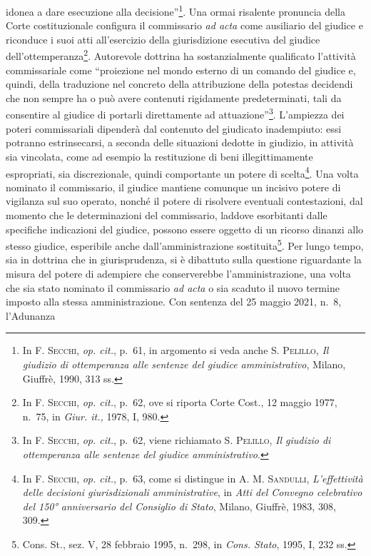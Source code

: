 \documentclass[12pt,it,a4paper,]{report}
\begin{document}
idonea a dare esecuzione alla decisione''\footnote{In
  \textsc{F. Secchi}, \emph{op. cit.}, p.~61, in argomento si veda anche
  S. \textsc{Pelillo}, \emph{Il giudizio di ottemperanza alle sentenze
  del giudice amministrativo}, Milano, Giuffrè, 1990, 313 ss.}. Una
ormai risalente pronuncia della Corte costituzionale configura il
commissario \emph{ad acta} come ausiliario del giudice e riconduce i
suoi atti all'esercizio della giurisdizione esecutiva del giudice
dell'ottemperanza\footnote{In \textsc{F. Secchi}, \emph{op. cit.},
  p.~62, ove si riporta Corte Cost., 12 maggio 1977, n.~75, in
  \emph{Giur. it.,} 1978, I, 980.}. Autorevole dottrina ha
sostanzialmente qualificato l'attività commissariale come ``proiezione
nel mondo esterno di un comando del giudice e, quindi, della traduzione
nel concreto della attribuzione della potestas decidendi che non sempre
ha o può avere contenuti rigidamente predeterminati, tali da consentire
al giudice di portarli direttamente ad attuazione''\footnote{In
  \textsc{F. Secchi}, \emph{op. cit.}, p.~62, viene richiamato S.
  \textsc{Pelillo}, \emph{Il giudizio di ottemperanza alle sentenze del
  giudice amministrativo}.}. L'ampiezza dei poteri commissariali
dipenderà dal contenuto del giudicato inadempiuto: essi potranno
estrinsecarsi, a seconda delle situazioni dedotte in giudizio, in
attività sia vincolata, come ad esempio la restituzione di beni
illegittimamente espropriati, sia discrezionale, quindi comportante un
potere di scelta\footnote{In \textsc{F. Secchi}, \emph{op. cit.}, p.~63,
  come si distingue in A. M. \textsc{Sandulli}, \emph{L'effettività
  delle decisioni giurisdizionali amministrative}, in \emph{Atti del
  Convegno celebrativo del 150° anniversario del Consiglio di Stato},
  Milano, Giuffrè, 1983, 308, 309.}. Una volta nominato il commissario,
il giudice mantiene comunque un incisivo potere di vigilanza sul suo
operato, nonché il potere di risolvere eventuali contestazioni, dal
momento che le determinazioni del commissario, laddove esorbitanti dalle
specifiche indicazioni del giudice, possono essere oggetto di un ricorso
dinanzi allo stesso giudice, esperibile anche dall'amministrazione
sostituita\footnote{Cons. St., sez. V, 28 febbraio 1995, n.~298, in
  \emph{Cons. Stato}, 1995, I, 232 ss.}. Per lungo tempo, sia in
dottrina che in giurisprudenza, si è dibattuto sulla questione
riguardante la misura del potere di adempiere che conserverebbe
l'amministrazione, una volta che sia stato nominato il commissario
\emph{ad acta} o sia scaduto il nuovo termine imposto alla stessa
amministrazione. Con sentenza del 25 maggio 2021, n.~8, l'Adunanza
\end{document}
